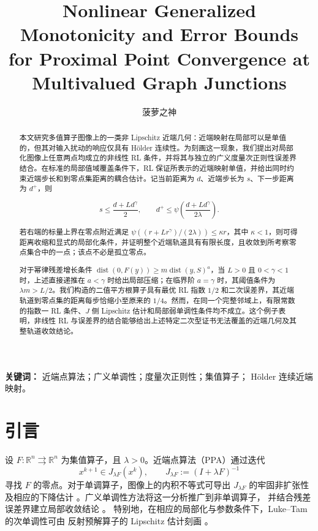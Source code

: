 \title{Nonlinear Generalized Monotonicity and Error Bounds\\
for Proximal Point Convergence at Multivalued Graph Junctions}
\author{菠萝之神}
\date{}
\maketitle

\begin{abstract}
本文研究多值算子图像上的一类非 Lipschitz 近端几何：近端映射在局部可以是单值的，但其对输入扰动的响应仅具有 Hölder 连续性。为刻画这一现象，我们提出对局部化图像上任意两点均成立的非线性 RL 条件，并将其与独立的广义度量次正则性误差界结合。在标准的局部值域覆盖条件下，RL 保证所表示的近端映射单值，并给出同时约束近端步长和到零点集距离的耦合估计。记当前距离为 \(d\)、近端步长为 \(s\)、下一步距离为 \(d^+\)，则

$$
s\leq\frac{d+Ld^\gamma}{2},
\qquad
d^+\leq\psi\!\left(\frac{d+Ld^\gamma}{2\lambda}\right).
$$

若右端的标量上界在零点附近满足 \(\psi((r+Lr^\gamma)/(2\lambda))\leq\kappa r\)，其中 \(\kappa<1\)，则可得距离收缩和显式的局部化条件，并证明整个近端轨道具有有限长度，且收敛到所考察零点集合中的一点；该点不必是孤立零点。

对于幂律残差增长条件 \(\operatorname{dist}(0,F(y))\geq m\operatorname{dist}(y,S)^a\)，当 \(L>0\) 且 \(0<\gamma<1\) 时，上述直接递推在 \(a<\gamma\) 时给出局部压缩；在临界阶 \(a=\gamma\) 时，其阈值条件为 \(\lambda m>L/2\)。我们构造的二值平方根算子具有最优 RL 指数 \(1/2\) 和二次误差界，其近端轨道到零点集的距离每步恰缩小至原来的 \(1/4\)。然而，在同一个完整邻域上，有限常数的指数一 RL 条件、\(J\) 侧 Lipschitz 估计和局部弱单调性条件均不成立。这个例子表明，非线性 RL 与误差界的结合能够给出上述特定二次型证书无法覆盖的近端几何及其整轨道收敛结论。



\end{abstract}

\medskip
\noindent\textbf{关键词：}
近端点算法；广义单调性；度量次正则性；集值算子；
H\"older 连续近端映射。

\section{引言}
\label{sec:introduction}

设 $F:\mathbb R^n\rightrightarrows\mathbb R^n$ 为集值算子，且
$\lambda>0$。近端点算法（PPA）通过迭代
\begin{equation}
 x^{k+1}\in J_{\lambda F}(x^k),
 \qquad
 J_{\lambda F}:=(I+\lambda F)^{-1}
 \label{eq:ppa-intro}
\end{equation}
寻找 $F$ 的零点。对于单调算子，图像上的内积不等式可导出
$J_{\lambda F}$ 的牢固非扩张性及相应的下降估计
\cite{Rockafellar1976PPA}。广义单调性方法将这一分析推广到非单调算子，
并结合残差误差界建立局部收敛结论
\cite{LukeTam2025GeneralizedMonotonicity,
LukeThaoTam2018Quantitative,
EvensPasLatafatPatrinos2025SemimonotonePPA}。
特别地，在相应的局部化与参数条件下，Luke--Tam 的次单调性可由
反射预解算子的 Lipschitz 估计刻画
\cite[Proposition~4]{LukeTam2025GeneralizedMonotonicity}。

